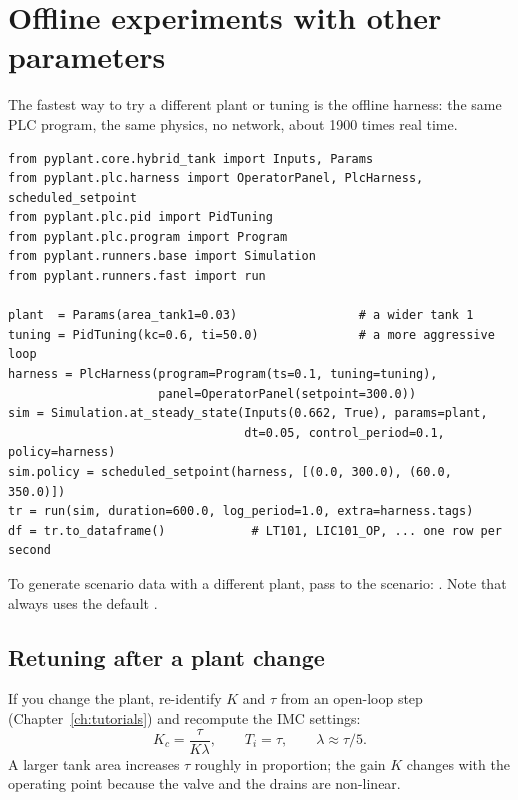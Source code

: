 \section{Offline experiments with other parameters}
\label{sec:offline}

The fastest way to try a different plant or tuning is the offline harness: the
same PLC program, the same physics, no network, about 1900 times real time.

\begin{lstlisting}
from pyplant.core.hybrid_tank import Inputs, Params
from pyplant.plc.harness import OperatorPanel, PlcHarness, scheduled_setpoint
from pyplant.plc.pid import PidTuning
from pyplant.plc.program import Program
from pyplant.runners.base import Simulation
from pyplant.runners.fast import run

plant  = Params(area_tank1=0.03)                 # a wider tank 1
tuning = PidTuning(kc=0.6, ti=50.0)              # a more aggressive loop
harness = PlcHarness(program=Program(ts=0.1, tuning=tuning),
                     panel=OperatorPanel(setpoint=300.0))
sim = Simulation.at_steady_state(Inputs(0.662, True), params=plant,
                                 dt=0.05, control_period=0.1, policy=harness)
sim.policy = scheduled_setpoint(harness, [(0.0, 300.0), (60.0, 350.0)])
tr = run(sim, duration=600.0, log_period=1.0, extra=harness.tags)
df = tr.to_dataframe()            # LT101, LIC101_OP, ... one row per second
\end{lstlisting}

To generate scenario data with a different plant, pass  to the
scenario: . Note
that  always uses the default .

\subsection{Retuning after a plant change}
If you change the plant, re-identify $K$ and $\tau$ from an open-loop step
(Chapter~\ref{ch:tutorials}) and recompute the IMC settings:
\[
  K_c = \frac{\tau}{K\lambda}, \qquad T_i = \tau, \qquad
  \lambda \approx \tau/5 .
\]
A larger tank area increases $\tau$ roughly in proportion; the gain $K$
changes with the operating point because the valve and the drains are
non-linear.
